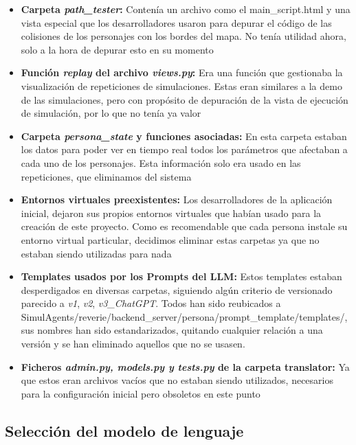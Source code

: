 \begin{itemize}
	\item \textbf{Carpeta \textit{path\_tester}:} Contenía un archivo como el main\_script.html y una vista especial que los desarrolladores usaron para depurar el código de las colisiones de los personajes con los bordes del mapa. No tenía utilidad ahora, solo a la hora de depurar esto en su momento
 
	\item \textbf{Función \textit{replay} del archivo \textit{views.py}:} Era una función que gestionaba la visualización de repeticiones de simulaciones. Estas eran similares a la demo de las simulaciones, pero con propósito de depuración de la vista de ejecución de simulación, por lo que no tenía ya valor
	
	\item \textbf{Carpeta \textit{persona\_state} y funciones asociadas:} En esta carpeta estaban los datos para poder ver en tiempo real todos los parámetros que afectaban a cada uno de los personajes. Esta información solo era usado en las repeticiones, que eliminamos del sistema
	
	\item \textbf{Entornos virtuales preexistentes:} Los desarrolladores de la aplicación inicial, dejaron sus propios entornos virtuales que habían usado para la creación de este proyecto. Como es recomendable que cada persona instale su entorno virtual particular, decidimos eliminar estas carpetas ya que no estaban siendo utilizadas para nada

    \item \textbf{Templates usados por los Prompts del LLM:} Estos templates estaban desperdigados en diversas carpetas, siguiendo algún criterio de versionado parecido a \textit{v1}, \textit{v2}, \textit{v3\_ChatGPT}. Todos han sido reubicados a SimulAgents/reverie/backend\_server/persona/prompt\_template/templates/, sus nombres han sido estandarizados, quitando cualquier relación a una versión y se han eliminado aquellos que no se usasen.
	
	\item \textbf{Ficheros \textit{admin.py, models.py y tests.py} de la carpeta translator:} Ya que estos eran archivos vacíos que no estaban siendo utilizados,  necesarios para la configuración inicial pero obsoletos en este punto
	
\end{itemize}

\subsection{Selección del modelo de lenguaje}\label{subsec:Selección del modelo de lenguaje}

